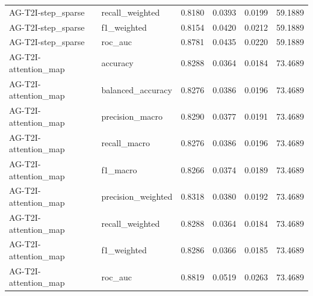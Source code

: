 \begin{tabular}{llrrrr}
AG-T2I-step_sparse & recall_weighted & 0.8180 & 0.0393 & 0.0199 & 59.1889 \\
AG-T2I-step_sparse & f1_weighted & 0.8154 & 0.0420 & 0.0212 & 59.1889 \\
AG-T2I-step_sparse & roc_auc & 0.8781 & 0.0435 & 0.0220 & 59.1889 \\
AG-T2I-attention_map & accuracy & 0.8288 & 0.0364 & 0.0184 & 73.4689 \\
AG-T2I-attention_map & balanced_accuracy & 0.8276 & 0.0386 & 0.0196 & 73.4689 \\
AG-T2I-attention_map & precision_macro & 0.8290 & 0.0377 & 0.0191 & 73.4689 \\
AG-T2I-attention_map & recall_macro & 0.8276 & 0.0386 & 0.0196 & 73.4689 \\
AG-T2I-attention_map & f1_macro & 0.8266 & 0.0374 & 0.0189 & 73.4689 \\
AG-T2I-attention_map & precision_weighted & 0.8318 & 0.0380 & 0.0192 & 73.4689 \\
AG-T2I-attention_map & recall_weighted & 0.8288 & 0.0364 & 0.0184 & 73.4689 \\
AG-T2I-attention_map & f1_weighted & 0.8286 & 0.0366 & 0.0185 & 73.4689 \\
AG-T2I-attention_map & roc_auc & 0.8819 & 0.0519 & 0.0263 & 73.4689 \\
\bottomrule
\end{tabular}
